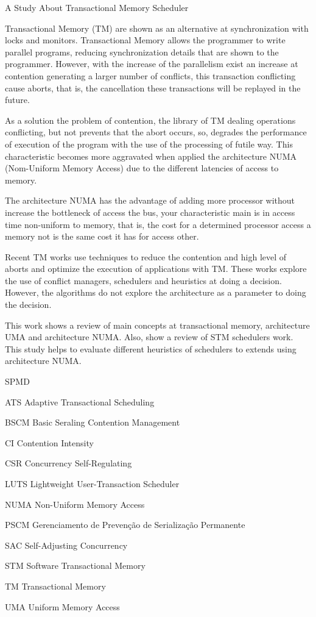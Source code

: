 \documentclass[ti]{texufpel}
\begin{document}
\begin{englishabstract}
  {A Study About Transactional Memory Scheduler}

Transactional Memory (TM) are shown as an alternative at synchronization with locks and monitors. Transactional Memory allows the programmer to write parallel programs, reducing synchronization details that are shown to the programmer. However, with the increase of the parallelism exist an increase at contention generating a larger number of conflicts, this transaction conflicting cause aborts, that is, the cancellation these transactions will be replayed in the future.

As a solution the problem of contention, the library of TM dealing operations conflicting, but not prevents that the abort occurs, so, degrades the performance of execution of the program with the use of the processing of futile way. This characteristic becomes more aggravated when applied the architecture NUMA (Nom-Uniform Memory Access) due to the different latencies of access to memory.

The architecture NUMA has the advantage of adding more processor without increase the bottleneck of access the bus, your characteristic main is in access time non-uniform to memory, that is, the cost for a determined processor access a memory not is the same cost it has for access other.

Recent TM works use techniques to reduce the contention and high level of aborts and optimize the execution of applications with TM. These works explore the use of conflict managers, schedulers and heuristics at doing a decision. However, the algorithms do not explore the architecture as a parameter to doing the decision.

This work shows a review of main concepts at transactional memory, architecture UMA and architecture NUMA. Also, show a review of STM schedulers work. This study helps to evaluate different heuristics of schedulers to extends using architecture NUMA.


\end{englishabstract}

\listoffigures

\begin{listofabbrv}{SPMD}
  \item[ATS] Adaptive Transactional Scheduling
  \item[BSCM] Basic Seraling Contention Management
  \item[CI] Contention Intensity
  \item[CSR] Concurrency Self-Regulating
  \item[LUTS] Lightweight User-Transaction Scheduler
  \item[NUMA] Non-Uniform Memory Access
  \item[PSCM] Gerenciamento de Prevenção de Serialização Permanente
  \item[SAC] Self-Adjusting Concurrency
  \item[STM] Software Transactional Memory
  \item[TM] Transactional Memory
  \item[UMA] Uniform Memory Access
\end{listofabbrv}
\end{document}
